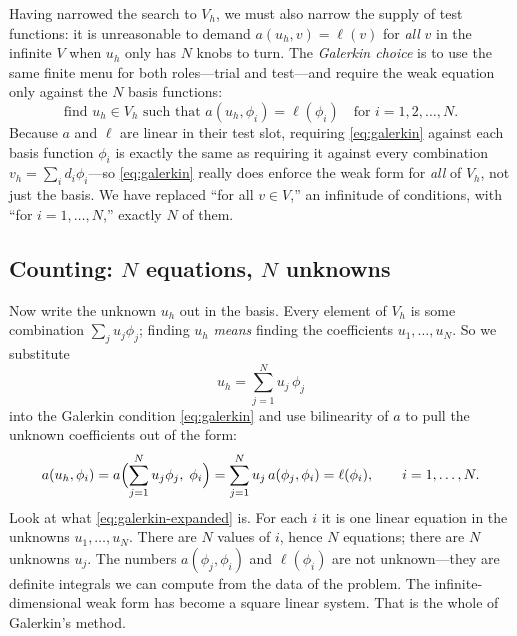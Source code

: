 Having narrowed the search to $V_h$, we must also narrow the supply of test
functions: it is unreasonable to demand $a(u_h,v)=\ell(v)$ for \emph{all} $v$ in
the infinite $V$ when $u_h$ only has $N$ knobs to turn. The \emph{Galerkin
choice} is to use the same finite menu for both roles---trial and test---and
require the weak equation only against the $N$ basis functions:
\begin{equation}
\text{find } u_h\in V_h \text{ such that }
a(u_h,\phi_i)=\ell(\phi_i)
\quad\text{for } i=1,2,\dots,N.
\label{eq:galerkin}
\end{equation}
Because $a$ and $\ell$ are linear in their test slot, requiring
\cref{eq:galerkin} against each basis function $\phi_i$ is exactly the same as
requiring it against every combination $v_h=\sum_i d_i\phi_i$---so
\cref{eq:galerkin} really does enforce the weak form for \emph{all} of $V_h$,
not just the basis. We have replaced ``for all $v\in V$,'' an infinitude of
conditions, with ``for $i=1,\dots,N$,'' exactly $N$ of them.

\subsection{Counting: \texorpdfstring{$N$}{N} equations, \texorpdfstring{$N$}{N} unknowns}

Now write the unknown $u_h$ out in the basis. Every element of $V_h$ is some
combination $\sum_j u_j\phi_j$; finding $u_h$ \emph{means} finding the
coefficients $u_1,\dots,u_N$. So we substitute
\begin{equation}
u_h=\sum_{j=1}^N u_j\,\phi_j
\label{eq:uh-expansion}
\end{equation}
into the Galerkin condition \cref{eq:galerkin} and use bilinearity of $a$ to pull
the unknown coefficients out of the form:
\begin{equation}
a(u_h,\phi_i)
=a\Bigl(\sum_{j=1}^N u_j\phi_j,\;\phi_i\Bigr)
=\sum_{j=1}^N u_j\,a(\phi_j,\phi_i)
=\ell(\phi_i),
\qquad i=1,\dots,N.
\label{eq:galerkin-expanded}
\end{equation}
Look at what \cref{eq:galerkin-expanded} is. For each $i$ it is one linear
equation in the unknowns $u_1,\dots,u_N$. There are $N$ values of $i$, hence $N$
equations; there are $N$ unknowns $u_j$. The numbers $a(\phi_j,\phi_i)$ and
$\ell(\phi_i)$ are not unknown---they are definite integrals we can compute from
the data of the problem. The infinite-dimensional weak form has become a
square linear system. That is the whole of Galerkin's method.


